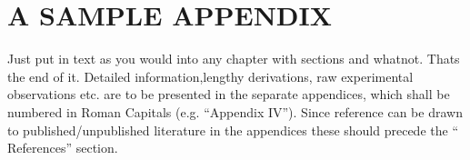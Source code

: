 
\appendix

\chapter{A SAMPLE APPENDIX}

Just put in text as you would into any chapter with sections and
whatnot.  Thats the end of it.
Detailed information,lengthy derivations, raw experimental observations etc. are to be
presented in the separate appendices, which shall be numbered in Roman Capitals (e.g.
“Appendix IV”). Since reference can be drawn to published/unpublished literature in the
appendices these should precede the “ References” section.